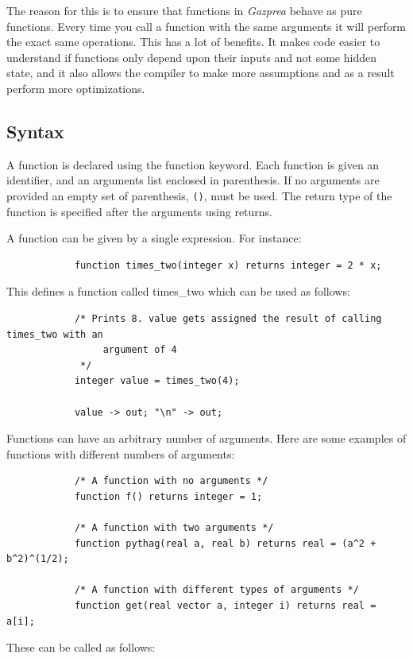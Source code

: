 \documentclass{article}
\begin{document}
	The reason for this is to ensure that functions in \textit{Gazprea} behave as pure functions. Every time you call a
	function with the same arguments it will perform the exact same operations. This has a lot of benefits. It makes
	code easier to understand if functions only depend upon their inputs and not some hidden state, and it also allows
	the compiler to make more assumptions and as a result perform more optimizations.

	\subsection{Syntax}

		A function is declared using the function keyword. Each function is given an identifier, and an arguments list
		enclosed in parenthesis. If no arguments are provided an empty set of parenthesis, \texttt{()}, must be used.
		The return type of the function is specified after the arguments using returns.

		A function can be given by a single expression. For instance:

		\begin{lstlisting}
			function times_two(integer x) returns integer = 2 * x;
		\end{lstlisting}

		This defines a function called times\_two which can be used as follows:

		\begin{lstlisting}
			/* Prints 8. value gets assigned the result of calling times_two with an
				 argument of 4
			 */
			integer value = times_two(4);

			value -> out; "\n" -> out;
		\end{lstlisting}

		Functions can have an arbitrary number of arguments. Here are some examples of functions with different numbers
		of arguments:

		\begin{lstlisting}
			/* A function with no arguments */
			function f() returns integer = 1;

			/* A function with two arguments */
			function pythag(real a, real b) returns real = (a^2 + b^2)^(1/2);

			/* A function with different types of arguments */
			function get(real vector a, integer i) returns real = a[i];
		\end{lstlisting}

		These can be called as follows:
\end{document}
